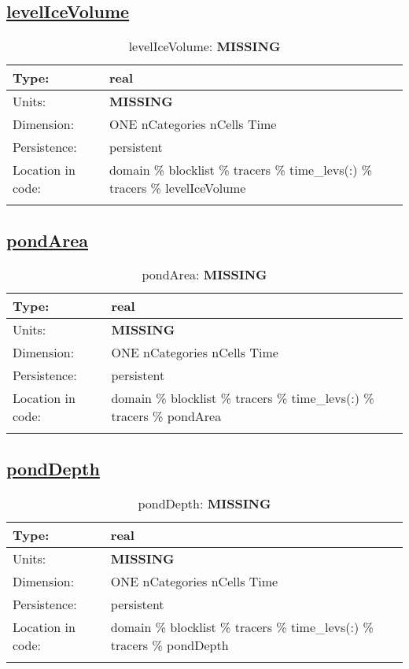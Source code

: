 \subsection[levelIceVolume]{\hyperref[sec:var_tab_tracers]{levelIceVolume}}
\label{subsec:var_sec_tracers_levelIceVolume}
\begin{center}
\begin{longtable}{| p{2.0in} | p{4.0in} |}
        \hline 
        Type: & real \\
        \hline 
        Units: & {\bf \color{red} MISSING} \\
        \hline 
        Dimension: & ONE nCategories nCells Time \\
        \hline 
        Persistence: & persistent \\
        \hline 
         Location in code: & domain \% blocklist \% tracers \% time\_levs(:) \% tracers \% levelIceVolume \\
         \hline 
    \caption{levelIceVolume: {\bf \color{red} MISSING}}
\end{longtable}
\end{center}
\subsection[pondArea]{\hyperref[sec:var_tab_tracers]{pondArea}}
\label{subsec:var_sec_tracers_pondArea}
\begin{center}
\begin{longtable}{| p{2.0in} | p{4.0in} |}
        \hline 
        Type: & real \\
        \hline 
        Units: & {\bf \color{red} MISSING} \\
        \hline 
        Dimension: & ONE nCategories nCells Time \\
        \hline 
        Persistence: & persistent \\
        \hline 
         Location in code: & domain \% blocklist \% tracers \% time\_levs(:) \% tracers \% pondArea \\
         \hline 
    \caption{pondArea: {\bf \color{red} MISSING}}
\end{longtable}
\end{center}
\subsection[pondDepth]{\hyperref[sec:var_tab_tracers]{pondDepth}}
\label{subsec:var_sec_tracers_pondDepth}
\begin{center}
\begin{longtable}{| p{2.0in} | p{4.0in} |}
        \hline 
        Type: & real \\
        \hline 
        Units: & {\bf \color{red} MISSING} \\
        \hline 
        Dimension: & ONE nCategories nCells Time \\
        \hline 
        Persistence: & persistent \\
        \hline 
         Location in code: & domain \% blocklist \% tracers \% time\_levs(:) \% tracers \% pondDepth \\
         \hline 
    \caption{pondDepth: {\bf \color{red} MISSING}}
\end{longtable}
\end{center}
